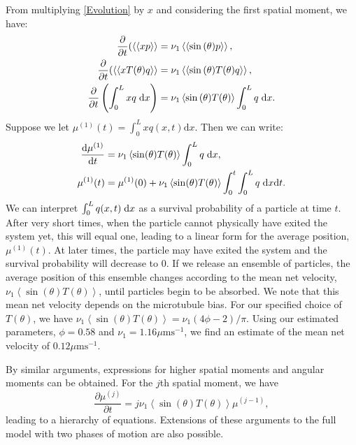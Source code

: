 \documentclass[twocolumn]{biophys}
\newlength\tindent
\renewcommand{\indent}{\hspace*{\tindent}}
\def\mean#1{\left< #1 \right>}
\begin{document}
\indent From multiplying \eqref{Evolution} by $x$ and considering the first spatial moment, we have:
\begin{align*}
 \frac{\partial}{\partial t} ( \mean{\mean{x p}} & = \nu_1 \mean{\mean{\sin{(\theta)} p}}, \\
 \frac{\partial}{\partial t} ( \mean{\mean{x T(\theta) q}} & = \nu_1 \mean{\mean{\sin{(\theta)} T(\theta) q}}, \\
 \frac{\partial}{\partial t} \left( \int_0^L x q \hspace{1mm} \text{d} x \right) & = \nu_1 \mean{\sin{(\theta)} T(\theta) } \int_0^L q \hspace{1mm} \text{d} x.
 \end{align*}
Suppose we let $\mu^{(1)}(t) = \int_0^L x q(x,t) \text{d} x  $. Then we can write:
\begin{align}
 \frac{\text{d} \mu^{(1)}}{\text{d} t} &= \nu_1 \mean{\sin(\theta) T(\theta)} \int_0^L q \hspace{1mm} \text{d} x, \nonumber \\
 \mu^{(1)}(t) &= \mu^{(1)}(0) + \nu_1 \mean{\sin(\theta) T(\theta)} \int_0^t \int_0^L q \hspace{1mm} \text{d} x \text{d} t.
\end{align}
We can interpret $\int_0^L q(x,t) \hspace{1mm} \text{d} x$ as a survival probability of a particle at time $t$.
After very short times, when the particle cannot physically have exited the system yet, this will equal one, leading to a linear form for the average position, $\mu^{(1)}(t)$. 
At later times, the particle may have exited the system and the survival probability will decrease to 0.
If we release an ensemble of particles, the average position of this ensemble changes according to the mean net velocity, $\nu_1 \mean{\sin(\theta) T(\theta)}$, until particles begin to be absorbed.
We note that this mean net velocity depends on the microtubule bias. 
For our specified choice of $T(\theta)$, we have $\nu_1 \mean{\sin(\theta) T(\theta)} = \nu_1 (4 \phi -2)/\pi$.
Using our estimated parameters, $\phi=0.58$ and $\nu_1 = 1.16 \mu \text{ms}^{-1}$, we find an estimate of the mean net velocity of $0.12 \mu \text{ms}^{-1}$.

\indent By similar arguments, expressions for higher spatial moments and angular moments can be obtained.
For the $j$th spatial moment, we have
\begin{equation}
 \frac{\partial \mu^{(j)}}{\partial t} = j \nu_1 \mean{\sin(\theta) T(\theta)} \mu^{(j-1)}, 
\end{equation}
leading to a hierarchy of equations.
Extensions of these arguments to the full model with two phases of motion are also possible. 
\end{document}
